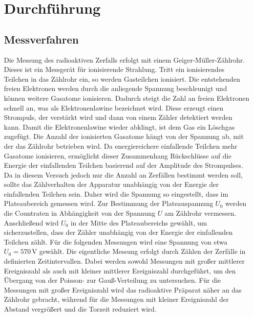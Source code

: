 \chapter{Durchführung} 
\label{ch:Durchfuehrung}

\section{Messverfahren}
\label{sec:Messverfahren}
Die Messung des radioaktiven Zerfalls erfolgt mit einem Geiger-Müller-Zählrohr. Dieses ist ein Messgerät für ionisierende Strahlung. Tritt ein ionisierendes Teilchen in das Zählrohr ein, so werden Gasteilchen ionisiert. Die entstehenden freien Elektronen werden durch die anliegende Spannung beschleunigt und können weitere Gasatome ionisieren. Dadurch steigt die Zahl an freien Elektronen schnell an, was als Elektronenlawine bezeichnet wird. Diese erzeugt einen Strompuls, der verstärkt wird und dann von einem Zähler detektiert werden kann. Damit die Elektronenlawine wieder abklingt, ist dem Gas ein Löschgas zugefügt.
Die Anzahl der ionisierten Gasatome hängt von der Spannung ab, mit der das Zählrohr betrieben wird. Da energiereichere einfallende Teilchen mehr Gasatome ionisieren, ermöglicht dieser Zusammenhang Rückschlüsse auf die Energie der einfallenden Teilchen basierend auf der Amplitude des Strompulses. Da in diesem Versuch jedoch nur die Anzahl an Zerfällen bestimmt werden soll, sollte das Zählverhalten der Apparatur unabhängig von der Energie der einfallenden Teilchen sein. Daher wird die Spannung so eingestellt, dass im Plateaubereich gemessen wird.
Zur Bestimmung der Plateauspannung $U_0$ werden die Countraten in Abhängigkeit von der Spannung $U$ am Zählrohr vermessen. Anschließend wird $U_0$ in der Mitte des Plateaubereichs gewählt, um sicherzustellen, dass der Zähler unabhängig von der Energie der einfallenden Teilchen zählt. Für die folgenden Messungen wird eine Spannung von etwa $U_0 = 570\,\mathrm{V}$ gewählt.
Die eigentliche Messung erfolgt durch Zählen der Zerfälle in definierten Zeitintervallen. Dabei werden sowohl Messungen mit großer mittlerer Ereigniszahl als auch mit kleiner mittlerer Ereigniszahl durchgeführt, um den Übergang von der Poisson- zur Gauß-Verteilung zu untersuchen. Für die Messungen mit großer Ereigniszahl wird das radioaktive Präparat näher an das Zählrohr gebracht, während für die Messungen mit kleiner Ereigniszahl der Abstand vergrößert und die Torzeit reduziert wird.

